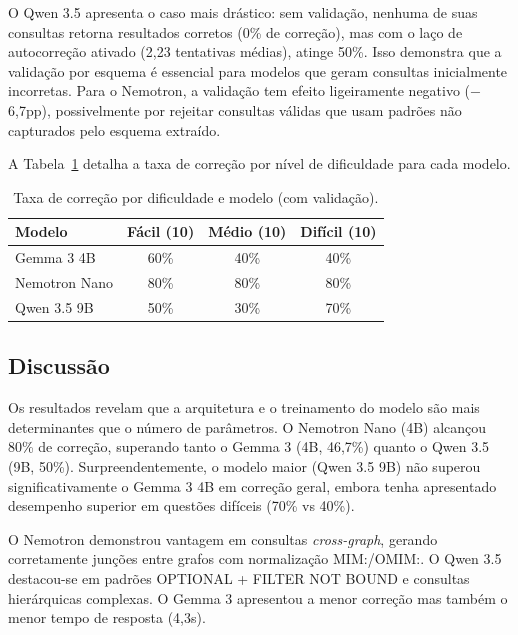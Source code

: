 \documentclass[12pt]{article}
\begin{document}
O Qwen 3.5 apresenta o caso mais dr\'{a}stico: sem valida\c{c}\~{a}o, nenhuma de suas consultas retorna resultados corretos (0\% de corre\c{c}\~{a}o), mas com o la\c{c}o de autocorre\c{c}\~{a}o ativado (2,23 tentativas m\'{e}dias), atinge 50\%. Isso demonstra que a valida\c{c}\~{a}o por esquema \'{e} essencial para modelos que geram consultas inicialmente incorretas. Para o Nemotron, a valida\c{c}\~{a}o tem efeito ligeiramente negativo ($-$6,7pp), possivelmente por rejeitar consultas v\'{a}lidas que usam padr\~{o}es n\~{a}o capturados pelo esquema extra\'{i}do.

A Tabela~\ref{tab:dificuldade} detalha a taxa de corre\c{c}\~{a}o por n\'{i}vel de dificuldade para cada modelo.

\begin{table}[H]
\centering
\caption{Taxa de corre\c{c}\~{a}o por dificuldade e modelo (com valida\c{c}\~{a}o).}
\label{tab:dificuldade}
\begin{tabular}{lccc}
\toprule
\textbf{Modelo} & \textbf{F\'{a}cil (10)} & \textbf{M\'{e}dio (10)} & \textbf{Dif\'{i}cil (10)} \\
\midrule
Gemma 3 4B      & 60\% & 40\% & 40\% \\
Nemotron Nano   & 80\% & 80\% & 80\% \\
Qwen 3.5 9B    & 50\% & 30\% & 70\% \\
\bottomrule
\end{tabular}
\end{table}


\subsection{Discuss\~{a}o}
\label{sec:discussao}

Os resultados revelam que a arquitetura e o treinamento do modelo s\~{a}o mais determinantes que o n\'{u}mero de par\^{a}metros. O Nemotron Nano (4B) alcan\c{c}ou 80\% de corre\c{c}\~{a}o, superando tanto o Gemma 3 (4B, 46,7\%) quanto o Qwen 3.5 (9B, 50\%). Surpreendentemente, o modelo maior (Qwen 3.5 9B) n\~{a}o superou significativamente o Gemma 3 4B em corre\c{c}\~{a}o geral, embora tenha apresentado desempenho superior em quest\~{o}es dif\'{i}ceis (70\% vs 40\%).

O Nemotron demonstrou vantagem em consultas \textit{cross-graph}, gerando corretamente jun\c{c}\~{o}es entre grafos com normaliza\c{c}\~{a}o MIM:/OMIM:. O Qwen 3.5 destacou-se em padr\~{o}es OPTIONAL + FILTER NOT BOUND e consultas hier\'{a}rquicas complexas. O Gemma 3 apresentou a menor corre\c{c}\~{a}o mas tamb\'{e}m o menor tempo de resposta (4,3s).
\end{document}
